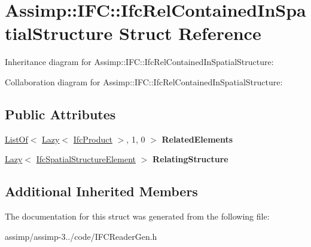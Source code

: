 \hypertarget{struct_assimp_1_1_i_f_c_1_1_ifc_rel_contained_in_spatial_structure}{\section{Assimp\+:\+:I\+F\+C\+:\+:Ifc\+Rel\+Contained\+In\+Spatial\+Structure Struct Reference}
\label{struct_assimp_1_1_i_f_c_1_1_ifc_rel_contained_in_spatial_structure}
}


Inheritance diagram for Assimp\+:\+:I\+F\+C\+:\+:Ifc\+Rel\+Contained\+In\+Spatial\+Structure\+:


Collaboration diagram for Assimp\+:\+:I\+F\+C\+:\+:Ifc\+Rel\+Contained\+In\+Spatial\+Structure\+:
\subsection*{Public Attributes}
\begin{DoxyCompactItemize}
\item 
\hypertarget{struct_assimp_1_1_i_f_c_1_1_ifc_rel_contained_in_spatial_structure_ab16323305cd5dc581e8b8986d8b92eee}{\hyperlink{struct_assimp_1_1_s_t_e_p_1_1_list_of}{List\+Of}$<$ \hyperlink{struct_assimp_1_1_s_t_e_p_1_1_lazy}{Lazy}$<$ \hyperlink{struct_assimp_1_1_i_f_c_1_1_ifc_product}{Ifc\+Product} $>$, 1, 0 $>$ {\bfseries Related\+Elements}}\label{struct_assimp_1_1_i_f_c_1_1_ifc_rel_contained_in_spatial_structure_ab16323305cd5dc581e8b8986d8b92eee}

\item 
\hypertarget{struct_assimp_1_1_i_f_c_1_1_ifc_rel_contained_in_spatial_structure_aa3fcf523062456ee9e40c98c331c45ca}{\hyperlink{struct_assimp_1_1_s_t_e_p_1_1_lazy}{Lazy}$<$ \hyperlink{struct_assimp_1_1_i_f_c_1_1_ifc_spatial_structure_element}{Ifc\+Spatial\+Structure\+Element} $>$ {\bfseries Relating\+Structure}}\label{struct_assimp_1_1_i_f_c_1_1_ifc_rel_contained_in_spatial_structure_aa3fcf523062456ee9e40c98c331c45ca}

\end{DoxyCompactItemize}
\subsection*{Additional Inherited Members}


The documentation for this struct was generated from the following file\+:\begin{DoxyCompactItemize}
\item 
assimp/assimp-\/3../code/I\+F\+C\+Reader\+Gen.\+h\end{DoxyCompactItemize}
